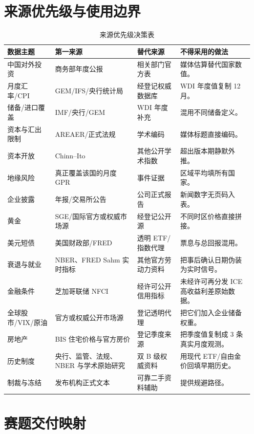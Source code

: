 \documentclass[UTF8,fontset=windows,12pt,openany]{ctexbook}
\begin{document}
\appendix

\chapter{来源优先级与使用边界}

\begin{longtable}{p{3.5cm}p{3.3cm}p{3.1cm}p{3.5cm}}
\caption{来源优先级决策表}\label{tab:source-priority}\\
\toprule
\textbf{数据主题} & \textbf{第一来源} & \textbf{替代来源} & \textbf{不得采用的做法}\\
\midrule
中国对外投资 & 商务部年度公报 & 相关部门官方表 & 媒体估算替代国家数值。\\
月度汇率/CPI & GEM/IFS/央行统计局 & 经登记权威数据库 & WDI 年度值复制 12 月。\\
储备/进口覆盖 & IMF/央行/GEM & WDI 年度补充 & 混用不同储备定义。\\
资本与汇出限制 & AREAER/正式法规 & 学术编码 & 媒体标题直接编码。\\
资本开放 & Chinn--Ito & 其他公开学术指数 & 超出版本期静默外推。\\
地缘风险 & 真正覆盖该国的月度 GPR & 事件证据 & 区域平均填所有国家。\\
企业披露 & 年报/交易所公告 & 公司正式报告 & 新闻数字无页码入表。\\
黄金 & SGE/国际官方或权威市场源 & 经登记公开源 & 不同时区价格直接拼接。\\
美元短债 & 美国财政部/FRED & 透明 ETF/指数代理 & 票息与总回报混用。\\
衰退与就业 & NBER、FRED Sahm 实时指标 & 其他官方劳动力资料 & 把事后确认日期伪装为实时信号。\\
金融条件 & 芝加哥联储 NFCI & 经许可公开信用指标 & 未经许可再分发 ICE 高收益利差原始数据。\\
全球股市/VIX/原油 & 官方或权威公开市场源 & 登记透明代理 & 把它们加入企业储备权重。\\
房地产 & BIS 住宅价格与官方房价 & 登记季度来源 & 把季度值复制成 3 条真实月度观测。\\
历史制度 & 央行、监管、法规、NBER 与学术原始研究 & 双 B 级权威资料 & 用现代 ETF/自由金价回填早期历史。\\
制裁与冻结 & 发布机构正式文本 & 可靠二手资料辅助 & 提供规避路径。\\
\bottomrule
\end{longtable}

\chapter{赛题交付映射}
\end{document}
